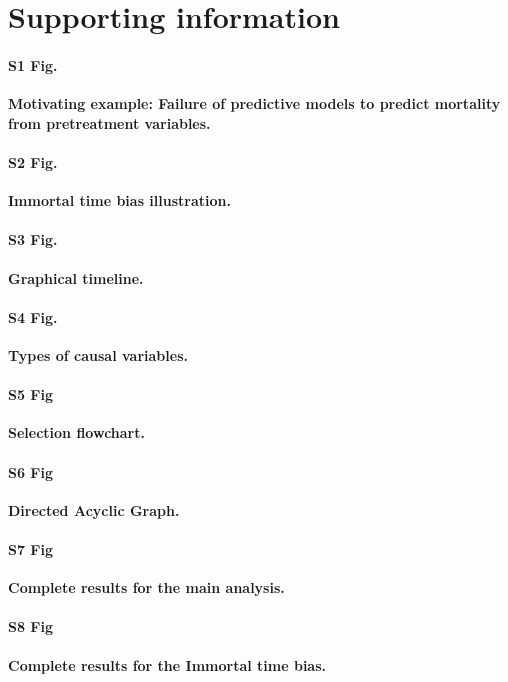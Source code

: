 \documentclass[10pt,letterpaper]{article}
\begin{document}
\clearpage

\section*{Supporting information}

\paragraph*{S1 Fig.}
\label{apd:motivating_example}
{\bf Motivating example: Failure of predictive models to predict mortality
  from pretreatment variables.}

\paragraph*{S2 Fig.}
\label{apd:immortal_time_bias}
{\bf Immortal time bias illustration.}

\paragraph*{S3 Fig.}
\label{apd:graphical_timeline}
{\bf Graphical timeline.}

\paragraph*{S4 Fig.}
\label{apd:causal_variables}
{\bf Types of causal variables.}

\paragraph*{S5 Fig}
\label{apd:selection_flowchart}
{\bf Selection flowchart.}

\paragraph*{S6 Fig}
\label{apd:causal_diagram_albumin}
{\bf Directed Acyclic Graph.}

\paragraph*{S7 Fig}
\label{apd:detailed_results}
{\bf Complete results for the main analysis.}

\paragraph*{S8 Fig}
\label{apd:detailed_results_itb}
{\bf Complete results for the Immortal time bias.}
\end{document}
